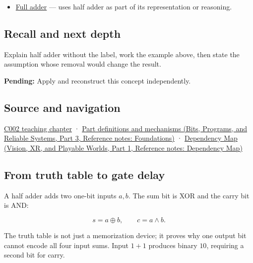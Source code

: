 \hypertarget{appendix-1652d27a8e90-used-by}{}

\begin{itemize}
\tightlist
\item
  \hyperref[appendix-d1a5b1e520c2]{Full adder} --- uses half adder as part of its representation or reasoning.
\end{itemize}

\subsection{Recall and next depth}\label{appendix-1652d27a8e90-recall-and-next-depth}

\hypertarget{appendix-1652d27a8e90-recall-and-next-depth}{}

Explain half adder without the label, work the example above, then state the assumption whose removal would change the result.

\textbf{Pending:} Apply and reconstruct this concept independently.

\subsection{Source and navigation}\label{appendix-1652d27a8e90-source-and-navigation}

\hypertarget{appendix-1652d27a8e90-source-and-navigation}{}

\hyperref[01-foundations-i-ch001-arithmetic-becomes-a-policy]{C002 teaching chapter} · \href{../01-Bits-Programs-and-Reliable-Systems-P03/main.pdf\#nameddest=appendix-fd090d982a15}{Part definitions and mechanisms (Bits, Programs, and Reliable Systems, Part 3, Reference notes: Foundations)} · \href{../07-Vision-XR-and-Playable-Worlds-P01/main.pdf\#nameddest=appendix-4ad47bdd269a}{Dependency Map (Vision, XR, and Playable Worlds, Part 1, Reference notes: Dependency Map)}

\subsection{From truth table to gate delay}\label{appendix-1652d27a8e90-from-truth-table-to-gate-delay}

\hypertarget{appendix-1652d27a8e90-from-truth-table-to-gate-delay}{}

A half adder adds two one-bit inputs \(a,b\). The sum bit is XOR and the carry bit is AND:

\[
s=a\oplus b,\qquad c=a\land b.
\]

The truth table is not just a memorization device; it proves why one output bit cannot encode all four input sums. Input \(1+1\) produces binary \(10\), requiring a second bit for carry.

